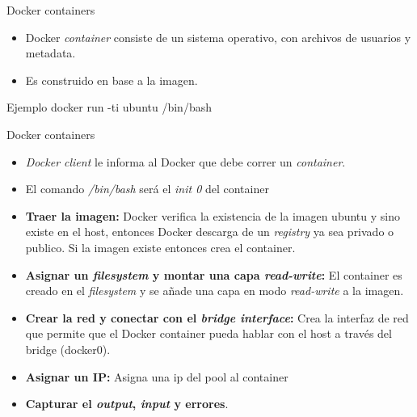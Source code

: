 \documentclass{bredelebeamer}
\begin{document}
\begin{frame}{Docker containers}
\begin{itemize}
	\item 	Docker \textit{container} consiste de  un sistema operativo, con archivos de usuarios y metadata.
	\item Es construido en base a la imagen.
\end{itemize}
\begin{block}{Ejemplo}
docker run -ti ubuntu /bin/bash
\end{block}

\end{frame}


\begin{frame}{Docker containers}
	\begin{itemize}
		\item \textit{Docker client} le informa al Docker que debe correr un \textit{container}.
		\item El comando \emph{/bin/bash} será el \textit{init 0} del container 
		\item \textbf{Traer la imagen:} Docker verifica la existencia de la imagen ubuntu y sino existe en el host, entonces Docker descarga de un \textit{registry} ya sea privado o publico. Si la imagen existe entonces crea el container.
		\item \textbf{Asignar un \emph{filesystem} y montar una capa \emph{read-write}:} El 
			container es creado en el \emph{filesystem} y se añade una capa en modo 
			\emph{read-write} a la imagen.
		\item \textbf{Crear la red y conectar con el \emph{bridge interface}:} Crea la interfaz de red que permite que el Docker container pueda hablar con el host a través del bridge (docker0).
		\item \textbf{Asignar un IP:} Asigna una ip del pool al container
		\item \textbf{Capturar el \textit{output}, \textit{input} y errores}.
	\end{itemize}
\end{frame}
\end{document}
